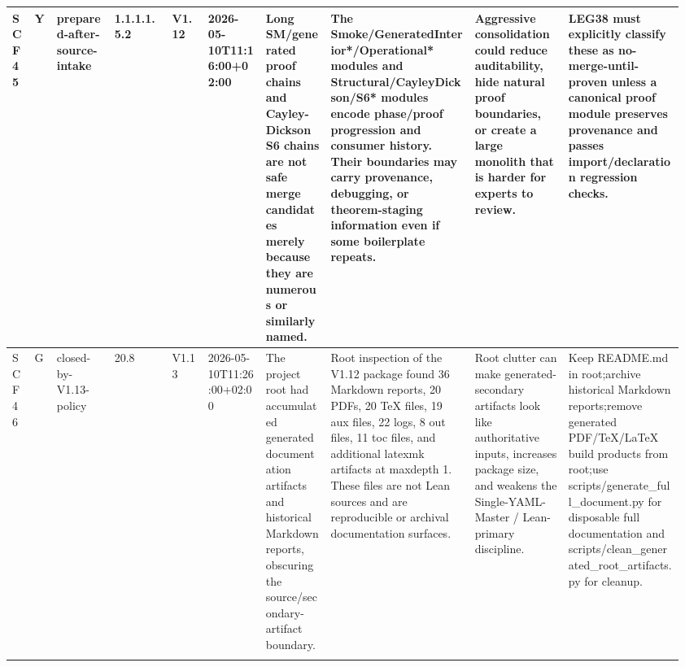 \begin{longtable}{L{0.03\linewidth} L{0.026\linewidth} L{0.087\linewidth} L{0.085\linewidth} L{0.052\linewidth} L{0.085\linewidth} L{0.095\linewidth} L{0.205\linewidth} L{0.13\linewidth} L{0.165\linewidth}}
SCF45 & Y & prepared-after-source-intake & 1.1.1.1.5.2 & V1.12 & 2026-05-10T11:16:00+02:00 & Long SM/\allowbreak{}generated proof chains and Cayley-Dickson S6 chains are not safe merge candidates merely because they are numerous or similarly named. & The Smoke/\allowbreak{}GeneratedInterior*/\allowbreak{}Operational* modules and Structural/\allowbreak{}CayleyDickson/\allowbreak{}S6* modules encode phase/\allowbreak{}proof progression and consumer history. Their boundaries may carry provenance, debugging, or theorem-staging information even if some boilerplate repeats. & Aggressive consolidation could reduce auditability, hide natural proof boundaries, or create a large monolith that is harder for experts to review. & LEG38 must explicitly classify these as no-merge-until-proven unless a canonical proof module preserves provenance and passes import/\allowbreak{}declaration regression checks.\\
\hline
\addlinespace[0.24em]
SCF46 & G & closed-by-V1.13-policy & 20.8 & V1.13 & 2026-05-10T11:26:00+02:00 & The project root had accumulated generated documentation artifacts and historical Markdown reports, obscuring the source/\allowbreak{}secondary-artifact boundary. & Root inspection of the V1.12 package found 36 Markdown reports, 20 PDFs, 20 TeX files, 19 aux files, 22 logs, 8 out files, 11 toc files, and additional latexmk artifacts at maxdepth 1. These files are not Lean sources and are reproducible or archival documentation surfaces. & Root clutter can make generated-secondary artifacts look like authoritative inputs, increases package size, and weakens the Single-YAML-Master /\allowbreak{} Lean-primary discipline. & Keep README.md in root;\newline archive historical Markdown reports;\newline remove generated PDF/\allowbreak{}TeX/\allowbreak{}LaTeX build products from root;\newline use scripts/\allowbreak{}generate\_full\_document.py for disposable full documentation and scripts/\allowbreak{}clean\_generated\_root\_artifacts.py for cleanup.\\
\hline
\addlinespace[0.24em]

\end{longtable}
